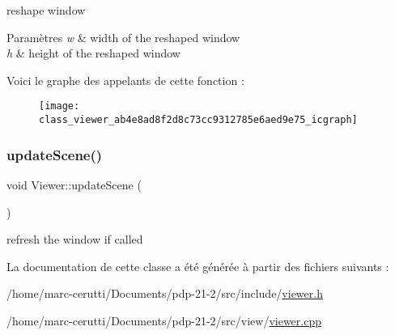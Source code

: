 reshape window 


\begin{DoxyParams}{Paramètres}
{\em w} & width of the reshaped window \\
\hline
{\em h} & height of the reshaped window \\
\hline
\end{DoxyParams}
Voici le graphe des appelants de cette fonction \+:\nopagebreak
\begin{figure}[H]
\begin{center}
\leavevmode
\texttt{[image: class\_viewer\_ab4e8ad8f2d8c73cc9312785e6aed9e75\_icgraph]}
\end{center}
\end{figure}
\mbox{\label{class_viewer_a7deac2bd87e6c5a76c6eb600306d6096}} 
\subsubsection{\texorpdfstring{update\+Scene()}{updateScene()}}
{\footnotesize\ttfamily void Viewer\+::update\+Scene (\begin{DoxyParamCaption}{ }\end{DoxyParamCaption})}



refresh the window if called 



La documentation de cette classe a été générée à partir des fichiers suivants \+:\begin{DoxyCompactItemize}
\item 
/home/marc-\/cerutti/\+Documents/pdp-\/21-\/2/src/include/\hyperlink{viewer_8h}{viewer.\+h}\item 
/home/marc-\/cerutti/\+Documents/pdp-\/21-\/2/src/view/\hyperlink{viewer_8cpp}{viewer.\+cpp}\end{DoxyCompactItemize}
